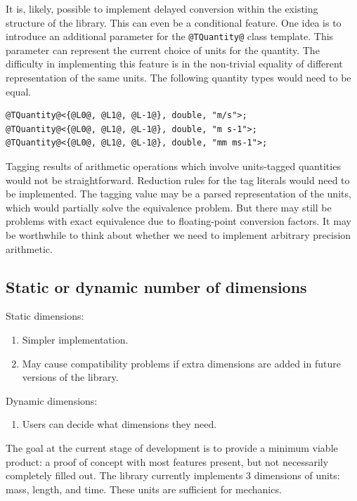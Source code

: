 \documentclass[11pt,letterpaper]{article}
\begin{document}
It is, likely, possible to implement delayed conversion within the existing
structure of the library.
This can even be a conditional feature.
One idea is to introduce an additional parameter for the \lstinline{@TQuantity@} class
template. This parameter can represent the current choice of units for the quantity.
The difficulty in implementing this feature is in the non-trivial equality of different
representation of the same units.
The following quantity types would need to be equal.
%
\begin{lstlisting}
@TQuantity@<{@L0@, @L1@, @L-1@}, double, "m/s">;
@TQuantity@<{@L0@, @L1@, @L-1@}, double, "m s-1">;
@TQuantity@<{@L0@, @L1@, @L-1@}, double, "mm ms-1">;
\end{lstlisting}

Tagging results of arithmetic operations which involve units-tagged quantities would not be
straightforward. Reduction rules for the tag literals would need to be implemented.
The tagging value may be a parsed representation of the units, which would partially solve the
equivalence problem.
But there may still be problems with exact equivalence due to floating-point conversion factors.
It may be worthwhile to think about whether we need to implement arbitrary precision arithmetic.

\subsection{Static or dynamic number of dimensions} %

Static dimensions:
\begin{enumerate}
    \item Simpler implementation.
    \item May cause compatibility problems if extra dimensions are added in future versions
      of the library.
\end{enumerate}

Dynamic dimensions:
\begin{enumerate}
    \item Users can decide what dimensions they need.
\end{enumerate}

The goal at the current stage of development is to provide a minimum viable product:
a proof of concept with most features present, but not necessarily completely filled out.
The library currently implements 3 dimensions of units:
mass, length, and time.
These units are sufficient for mechanics.
\end{document}
